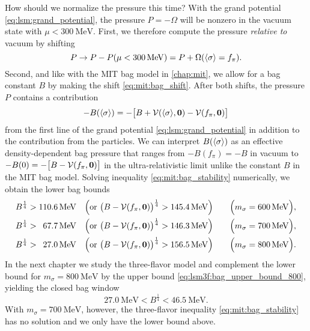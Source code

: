 How should we normalize the pressure this time?
With the grand potential \eqref{eq:lsm:grand_potential},
the pressure $P = - \Omega$ will be nonzero in the vacuum state with $\mu < \SI{300}{\mega\electronvolt}$.
First, we therefore compute the pressure \emph{relative to} vacuum by shifting
\begin{equation}
	P \rightarrow P - P(\mu < \SI{300}{\mega\electronvolt}) = P + \Omega(\langle \sigma \rangle=f_\pi) .
\label{eq:lsm:pressure_bagless}
\end{equation}
Second, and like with the MIT bag model in \cref{chap:mit},
we allow for a bag constant $B$ by making the shift \eqref{eq:mit:bag_shift}.
After both shifts, the pressure $P$ contains a contribution
\begin{equation}
	-B(\langle \sigma \rangle) = -\big[B+\mathcal{V}(\langle \sigma \rangle,{\bm{0}})-\mathcal{V}(f_\pi,{\bm{0}})\big]
\label{eq:lsm:bag_pressure}
\end{equation}
from the first line of the grand potential \eqref{eq:lsm:grand_potential} in addition to the contribution from the particles.
We can interpret $B(\langle \sigma \rangle)$ as an effective density-dependent bag pressure that ranges from $-B(f_\pi)=-B$ in vacuum to $-B(0) = -\big[B-\mathcal{V}(f_\pi,{\bm{0}})\big]$ in the ultra-relativistic limit
unlike the constant $B$ in the MIT bag model.
Solving inequality \eqref{eq:mit:bag_stability} numerically, we obtain the lower bag bounds
\begin{subequations}
\begin{align}
	B^\frac14 > \SI{110.6}{\mega\electronvolt}           \quad \Big(\text{or } \big(B-\mathcal{V}(f_\pi,{\bm{0}})\big)^\frac14 > \SI{145.4}{\mega\electronvolt}\Big) \qquad \Big(m_\sigma = \SI{600}{\mega\electronvolt}\Big), \\
	B^\frac14 > \phantom{0}\SI{67.7}{\mega\electronvolt} \quad \Big(\text{or } \big(B-\mathcal{V}(f_\pi,{\bm{0}})\big)^\frac14 > \SI{146.3}{\mega\electronvolt}\Big) \qquad \Big(m_\sigma = \SI{700}{\mega\electronvolt}\Big), \\
	B^\frac14 > \phantom{0}\SI{27.0}{\mega\electronvolt} \quad \Big(\text{or } \big(B-\mathcal{V}(f_\pi,{\bm{0}})\big)^\frac14 > \SI{156.5}{\mega\electronvolt}\Big) \qquad \Big(m_\sigma = \SI{800}{\mega\electronvolt}\Big).
\end{align}%
\label{eq:lsm:bag_lower_bound}%
\end{subequations}%
In the next chapter we study the three-flavor model and complement the lower bound for $m_\sigma=\SI{800}{\mega\electronvolt}$ by the upper bound \eqref{eq:lsm3f:bag_upper_bound_800},
yielding the closed bag window
\begin{equation}
	\SI{27.0}{\mega\electronvolt} < B^\frac14 < \SI{46.5}{\mega\electronvolt}.
\label{eq:lsm:bag_window_800}
\end{equation}
With $m_\sigma=\SI{700}{\mega\electronvolt}$, however, the three-flavor inequality \eqref{eq:mit:bag_stability} has no solution and we only have the lower bound above.

